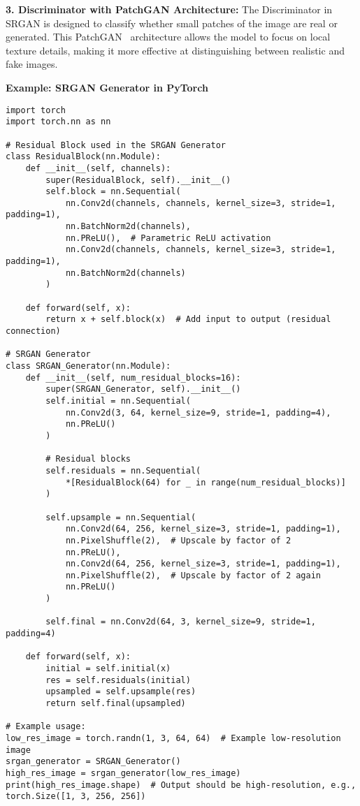 \textbf{3. Discriminator with PatchGAN Architecture:}  
The Discriminator in SRGAN is designed to classify whether small patches of the image are real or generated. This PatchGAN~\cite{isola2017image} architecture allows the model to focus on local texture details, making it more effective at distinguishing between realistic and fake images.

\textbf{Example: SRGAN Generator in PyTorch}

\begin{lstlisting}[style=python]
import torch
import torch.nn as nn

# Residual Block used in the SRGAN Generator
class ResidualBlock(nn.Module):
    def __init__(self, channels):
        super(ResidualBlock, self).__init__()
        self.block = nn.Sequential(
            nn.Conv2d(channels, channels, kernel_size=3, stride=1, padding=1),
            nn.BatchNorm2d(channels),
            nn.PReLU(),  # Parametric ReLU activation
            nn.Conv2d(channels, channels, kernel_size=3, stride=1, padding=1),
            nn.BatchNorm2d(channels)
        )

    def forward(self, x):
        return x + self.block(x)  # Add input to output (residual connection)

# SRGAN Generator
class SRGAN_Generator(nn.Module):
    def __init__(self, num_residual_blocks=16):
        super(SRGAN_Generator, self).__init__()
        self.initial = nn.Sequential(
            nn.Conv2d(3, 64, kernel_size=9, stride=1, padding=4),
            nn.PReLU()
        )

        # Residual blocks
        self.residuals = nn.Sequential(
            *[ResidualBlock(64) for _ in range(num_residual_blocks)]
        )

        self.upsample = nn.Sequential(
            nn.Conv2d(64, 256, kernel_size=3, stride=1, padding=1),
            nn.PixelShuffle(2),  # Upscale by factor of 2
            nn.PReLU(),
            nn.Conv2d(64, 256, kernel_size=3, stride=1, padding=1),
            nn.PixelShuffle(2),  # Upscale by factor of 2 again
            nn.PReLU()
        )

        self.final = nn.Conv2d(64, 3, kernel_size=9, stride=1, padding=4)

    def forward(self, x):
        initial = self.initial(x)
        res = self.residuals(initial)
        upsampled = self.upsample(res)
        return self.final(upsampled)

# Example usage:
low_res_image = torch.randn(1, 3, 64, 64)  # Example low-resolution image
srgan_generator = SRGAN_Generator()
high_res_image = srgan_generator(low_res_image)
print(high_res_image.shape)  # Output should be high-resolution, e.g., torch.Size([1, 3, 256, 256])
\end{lstlisting}

